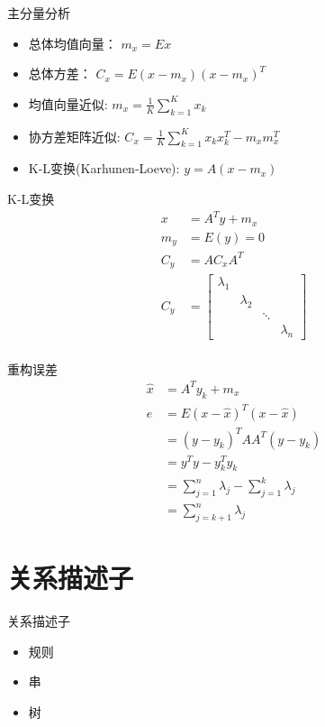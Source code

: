 \documentclass[presentation]{beamer}
\begin{document}
\begin{frame}[label={sec:org3507ec4}]{主分量分析}
\begin{itemize}
\item 总体均值向量：  \(m_x = Ex\)
\item 总体方差：  \(C_x = E(x-m_x)(x-m_x)^T\)
\item 均值向量近似: \(m_x= \frac{1}{K}\sum_{k=1}^K x_k\)
\item 协方差矩阵近似: \(C_x=\frac{1}{K}\sum_{k=1}^K x_k x_k^T-m_x m_x^T\)
\item K-L变换(Karhunen-Loeve):  \(y=A(x-m_x)\)
\end{itemize}
\end{frame}
\begin{frame}[label={sec:org8c34fd7}]{K-L变换}
\begin{align*}
x &= A^T y+m_x \\
m_y & =E(y)=0 \\
C_y &=AC_xA^T \\
C_y &=\begin{bmatrix}
\lambda_1 & & &  \\
 & \lambda_2 & & \\
 & & \ddots & \\
 & & & \lambda_n 
\end{bmatrix}\\
\end{align*}
\end{frame}

\begin{frame}[label={sec:orgb14fdd8}]{重构误差}
\begin{align*}
\hat x &= A^T y_k+m_x \\
e &= E(x-\hat x)^T(x-\hat x) \\
  &= (y-y_k)^{T}AA^T (y-y_k) \\
  &= y^T y-y_k^T y_k \\
  &= \sum_{j=1}^n \lambda_j -\sum_{j=1}^k \lambda_j \\
  &= \sum_{j=k+1}^n \lambda_j
\end{align*}
\end{frame}

\section{关系描述子}
\label{sec:orge9860c2}
\begin{frame}[label={sec:orgfec2d1d}]{关系描述子}
\begin{itemize}
\item 规则
\item 串
\item 树
\end{itemize}
\end{frame}
\end{document}
